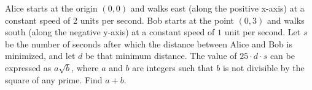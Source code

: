 Alice starts at the origin $(0, 0)$ and walks east (along the positive x-axis) at a constant speed of 2 units per second. Bob starts at the point $(0, 3)$ and walks south (along the negative y-axis) at a constant speed of $1$ unit per second. Let $s$ be the number of seconds after which the distance between Alice and Bob is minimized, and let $d$ be that minimum distance. The value of $25 \cdot d \cdot s$ can be expressed as $a\sqrt{b}$, where $a$ and $b$ are integers such that $b$ is not divisible by the square of any prime. Find $a + b$.
